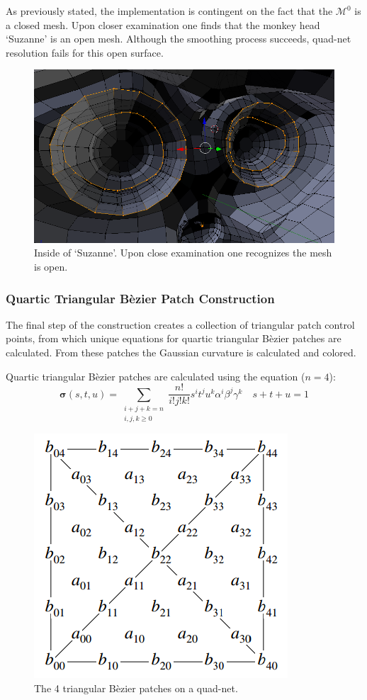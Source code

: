 \documentclass[11pt]{article}
\begin{document}
	\vspace{0.25in}
	As previously stated, the implementation is contingent on the fact that the $\mathcal{M}^0$ is a closed mesh. Upon closer examination one finds that the monkey head `Suzanne' is an open mesh. Although the smoothing process succeeds, quad-net resolution fails for this open surface. \\

	\begin{figure}[h]
		\centering
		\captionsetup{justification=centering}
		\includegraphics[width=.5\linewidth]{img/quad_monkey}
		\caption{Inside of `Suzanne'. Upon close examination one recognizes the mesh is open.}	
	\end{figure}
	
	\subsubsection*{Quartic Triangular B\`ezier Patch Construction}
	The final step of the construction creates a collection of triangular patch control points, from which unique equations for quartic triangular B\`ezier patches are calculated. From these patches the Gaussian curvature is calculated and colored.   
	
	Quartic triangular B\`ezier patches are calculated using the equation ($n=4$): 
	$$\bm{\sigma}(s,t,u) = \displaystyle \sum_{\begin{smallmatrix} i+j+k=n \\ i,j,k \ge 0\end{smallmatrix}} \frac{n!}{i!j!k!} s^i t^j u^k \alpha^i \beta^j \gamma^k \quad s + t + u = 1$$ 
	
	\pagebreak
	\begin{figure}[h]
		\centering
		\captionsetup{justification=centering}
		\includegraphics[width=.4\linewidth]{img/bezier_loop}
		\caption{The 4 triangular B\`ezier patches on a quad-net. \cite{loop1994smooth}}	
	\end{figure}
	
\end{document}
